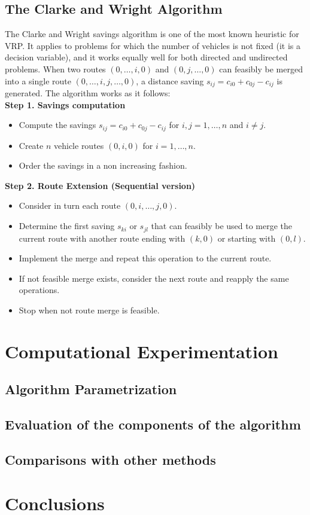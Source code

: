 \documentclass[10pt,twoside]{article}
\begin{document}
\subsection{The Clarke and Wright Algorithm}
The Clarke and Wright savings algorithm is one of the most known heuristic for
VRP. It applies to problems for which the number of vehicles is not fixed (it is
 a decision variable), and it works equally well for both directed and 
undirected problems. When two routes ${(0,…,i,0)}$ and ${(0,j,…,0)}$ can 
feasibly be merged into a single route ${(0,…,i,j,…,0)}$, a distance saving
${s_{ij}=c_{i0}+c_{0j}-c_{ij}}$ is generated. The algorithm works as it follows:
\\

\small{\textbf{Step 1. Savings computation}}
\begin{itemize}
\item Compute the savings $s_{ij}=c_{i0}+c_{0j}-c_{ij}$ for $i,j=1,…,n$ and $i \neq j$.
\item Create ${n}$ vehicle routes ${(0,i,0)}$ for ${i=1,…,n}$.
\item Order the savings in a non increasing fashion.\\
\end{itemize}
\small{\textbf{Step 2. Route Extension (Sequential version)}}
\begin{itemize}
\item Consider in turn each route ${(0,i,…,j,0)}$.
\item Determine the first saving ${s_{ki}}$ or ${s_{jl}}$ that can feasibly be used to merge the current route with another route ending with ${(k,0)}$ or starting with ${(0,l)}$.
\item Implement the merge and repeat this operation to the current route.
\item If not feasible merge exists, consider the next route and reapply the same operations.
\item Stop when not route merge is feasible.
\end{itemize}


\section{Computational Experimentation}\label{sec_results}
\subsection{Algorithm Parametrization}\label{sec_param}

\subsection{Evaluation of the components of the algorithm}\label{sec_eval}

\subsection{Comparisons with other methods}\label{sec_comp}

\section{Conclusions}\label{sec_conclusions}


{\small

{\nocite{*}}}
\end{document}

